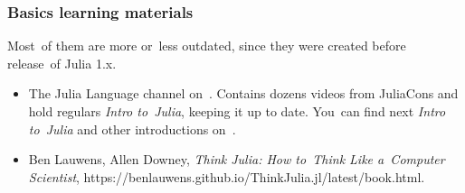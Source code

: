 \documentclass[10pt,t]{beamer}
\begin{document}
\begin{frame}
  \frametitle{Basics learning materials}


  Most~of them are more or~less outdated, since they were created
  before release~of Julia 1.x.
  \begin{itemize}




  \item The Julia Language channel
    on~.
    Contains dozens videos from JuliaCons and hold regulars
    \textit{Intro to~Julia}, keeping it up to date. You~can find
    next \textit{Intro to~Julia} and other introductions
    on~.

  \item Ben Lauwens, Allen Downey, \textit{Think Julia: How to~Think
      Like a~Computer Scientist},
    {https://benlauwens.github.io/ThinkJulia.jl/latest/book.html}.

  \end{itemize}

\end{frame}
\end{document}

